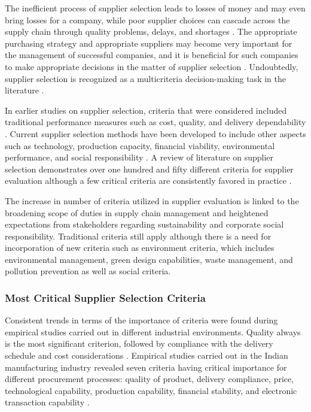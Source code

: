 \documentclass[11pt]{article}
\begin{document}
The inefficient process of supplier selection leads to losses of money and may even bring losses for a company, while poor supplier choices can cascade across the supply chain through quality problems, delays, and shortages \cite{ref23,ref67}. The appropriate purchasing strategy and appropriate suppliers may become very important for the management of successful companies, and it is beneficial for such companies to make appropriate decisions in the matter of supplier selection \cite{ref23}. Undoubtedly, supplier selection is recognized as a multicriteria decision-making task in the literature \cite{ref24,ref25}.



In earlier studies on supplier selection, criteria that were considered included traditional performance measures such as cost, quality, and delivery dependability \cite{ref13}. Current supplier selection methods have been developed to include other aspects such as technology, production capacity, financial viability, environmental performance, and social responsibility \cite{ref26,ref27}. A review of literature on supplier selection demonstrates over one hundred and fifty different criteria for supplier evaluation although a few critical criteria are consistently favored in practice \cite{ref28}.

The increase in number of criteria utilized in supplier evaluation is linked to the broadening scope of duties in supply chain management and heightened expectations from stakeholders regarding sustainability and corporate social responsibility. Traditional criteria still apply although there is a need for incorporation of new criteria such as environment criteria, which includes environmental management, green design capabilities, waste management, and pollution prevention as well as social criteria.

\subsubsection{Most Critical Supplier Selection Criteria}

Consistent trends in terms of the importance of criteria were found during empirical studies carried out in different industrial environments. Quality always is the most significant criterion, followed by compliance with the delivery schedule and cost considerations \cite{ref26,ref28}. Empirical studies carried out in the Indian manufacturing industry revealed seven criteria having critical importance for different procurement processes: quality of product, delivery compliance, price, technological capability, production capability, financial stability, and electronic transaction capability \cite{ref26}.
\end{document}
